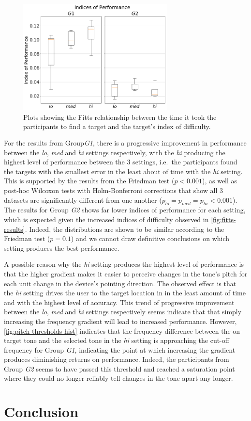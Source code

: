 \documentclass{article}
\begin{document}
\begin{figure}
  \centering
  \includegraphics[width=0.7\textwidth]{figures/fitts_ips.png}
  \caption{Plots showing the Fitts relationship between the time it took the participants to find a target and the target's index of difficulty. }\label{fig:fitts-ips}
\end{figure}

For the results from Group\textit{G1}, there is a progressive improvement in performance between the \textit{lo}, \textit{med} and \textit{hi} settings respectively, with the \textit{hi} producing the highest level of performance between the 3 settings, i.e.\ the participants found the targets with the smallest error in the least about of time with the \textit{hi} setting.
This is supported by the results from the Friedman test ($p < 0.001$), as well as post-hoc Wilcoxon tests with Holm-Bonferroni corrections that show all 3 datasets are significantly different from one another ($p_{lo} = p_{med} = p_{hi} < 0.001$).
The results for Group \textit{G2} shows far lower indices of performance for each setting, which is expected given the increased indices of difficulty observed in \cref{fig:fitts-results}.
Indeed, the distributions are shown to be similar according to the Friedman test ($p = 0.1$) and we cannot draw definitive conclusions on which setting produces the best performance. 

A possible reason why the \textit{hi} setting produces the highest level of performance is that the higher gradient makes it easier to perceive changes in the tone's pitch for each unit change in the device's pointing direction.
The observed effect is that the \textit{hi} setting drives the user to the target location in in the least amount of time and with the highest level of accuracy. 
This trend of progressive improvement between the \textit{lo}, \textit{med} and \textit{hi} settings respectively seems indicate that that simply increasing the frequency gradient will lead to increased performance.
However, \cref{fig:pitch-thresholds-hist} indicates that the frequency difference between the on-target tone and the selected tone in the \textit{hi} setting is approaching the cut-off frequency for Group \textit{G1}, indicating the point at which increasing the gradient produces diminishing returns on performance. 
Indeed, the participants from Group \textit{G2} seems to have passed this threshold and reached a saturation point where they could no longer reliably tell changes in the tone apart any longer. 

\section{Conclusion}\label{sec:conclusion}



\end{document}
